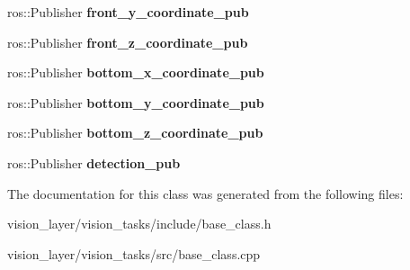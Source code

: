\begin{DoxyCompactItemize}
ros\+::\+Publisher {\bfseries front\+\_\+y\+\_\+coordinate\+\_\+pub}
\item 
\mbox{\label{classBase__class_aedeb44746d27ca5977d17ad1faeb1f9a}} 
ros\+::\+Publisher {\bfseries front\+\_\+z\+\_\+coordinate\+\_\+pub}
\item 
\mbox{\label{classBase__class_a6a7ef2fc8b0c86779d4c2f271b2d4c6f}} 
ros\+::\+Publisher {\bfseries bottom\+\_\+x\+\_\+coordinate\+\_\+pub}
\item 
\mbox{\label{classBase__class_a125135126a1572aa2511aec025cfc9b6}} 
ros\+::\+Publisher {\bfseries bottom\+\_\+y\+\_\+coordinate\+\_\+pub}
\item 
\mbox{\label{classBase__class_a61d6fa33aab9cc448a8cf40c2bddbc6d}} 
ros\+::\+Publisher {\bfseries bottom\+\_\+z\+\_\+coordinate\+\_\+pub}
\item 
\mbox{\label{classBase__class_ad248659f61010ebd3c64965a2c70546f}} 
ros\+::\+Publisher {\bfseries detection\+\_\+pub}
\end{DoxyCompactItemize}


The documentation for this class was generated from the following files\+:\begin{DoxyCompactItemize}
\item 
vision\+\_\+layer/vision\+\_\+tasks/include/base\+\_\+class.\+h\item 
vision\+\_\+layer/vision\+\_\+tasks/src/base\+\_\+class.\+cpp\end{DoxyCompactItemize}
